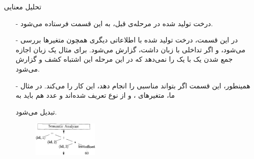 \begin{frame}{تحلیل معنایی }
\begin{itemize}\itemr
\item[-]
درخت تولید شده در مرحله‌ی قبل، به این قسمت فرستاده می‌شود.

\item[-]
در این قسمت، درخت تولید شده با اطلاعاتی دیگری همچون 
متغیر‌ها بررسی می‌شود، و اگر تداخلی با زبان داشت، گزارش می‌شود. برای مثال یک زبان اجازه جمع شدن یک 
با یک
را نمی‌دهد که در این مرحله این اشتباه کشف و گزارش می‌شود.

\item[-]
همینطور، این قسمت اگر بتواند
مناسبی را انجام دهد، این کار را می‌کند. در مثال ما، متغیر‌های 
،
و 
از نوع
تعریف شده‌اند و عدد 
هم باید به 

تبدیل می‌شود.

\begin{figure}[H]
\begin{center}
\includegraphics[width=0.3\textwidth, height=0.31\textheight]{docs/images/semantic}
\end{center}
\end{figure}
\end{itemize}
\end{frame}
